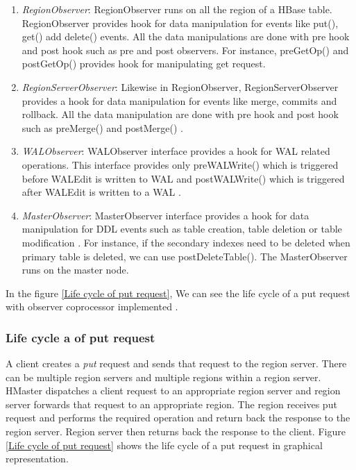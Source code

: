 \documentclass[11pt,a4paper,bibtotoc,idxtotoc,headsepline,footsepline,footexclude,BCOR12mm,DIV13]{scrbook}
\begin{document}
\begin{enumerate}
    
\item \emph{RegionObserver}: RegionObserver runs on all the region of a HBase table. RegionObserver provides hook for data manipulation for events like put(), get() add delete() events. All the data manipulations are done with pre hook and post hook \cite{hbase:essential} such as pre and post observers. For instance, preGetOp() and postGetOp() provides hook for manipulating get request. 

\item \emph{RegionServerObserver}: Likewise in RegionObserver, RegionServerObserver provides a hook for data manipulation for events like merge, commits and rollback. All the data manipulation are done with pre hook and post hook such as preMerge() and postMerge() \cite{hbase:essential}. 

\item \emph{WALObserver}: WALObserver interface provides a hook for WAL \cite{hbase:essential} related operations. This interface provides only preWALWrite() which is triggered before WALEdit is written to WAL and postWALWrite() which is triggered after WALEdit is written to a WAL \cite{hbase:essential}.

\item \emph{MasterObserver}: MasterObserver interface provides a hook for data manipulation for DDL events such as table creation, table deletion or table modification \cite{coprocessor:types}. For instance, if the secondary indexes need to be deleted when primary table is deleted, we can use postDeleteTable(). The MasterObserver runs on the master node.

\end{enumerate}


In the figure \ref{Life cycle of put request}, We can see the life cycle of a put request with observer coprocessor implemented \cite{coprocessor:detail}.

\subsubsection{Life cycle a of put request}
\label{subsubsec:Life cycle of put request}

A client creates a \emph{put} request and sends that request to the region server. There can be multiple region servers and multiple regions within a region server. HMaster dispatches a client request to an appropriate region server and region server forwards that request to an appropriate region. The region receives put request and performs the required operation and return back the response to the region server. Region server then returns back the response to the client. Figure \ref{Life cycle of put request} shows the life cycle of a put request in graphical representation. 
\end{document}
